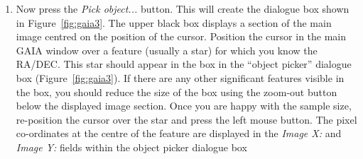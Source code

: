 \documentclass[twoside,11pt]{article}
\newcommand{\latex}[1]{#1}
\newcommand{\html}[1]{}
\renewcommand{\_}{\texttt{\symbol{95}}}
\begin{document}
\begin{enumerate}
\item Now press the \emph{Pick object...} button. This will create the
dialogue box shown in \latex{Figure~\ref{fig:gaia3}.} \html{the next figure.}
The upper black box displays a section of the main image centred on the position 
of the cursor. Position the cursor in the main GAIA window over a feature
(usually a star) for which you know the RA/DEC. This star should appear
in the box in the ``object picker'' dialogue box (Figure~\ref{fig:gaia3}).
If there are any other significant features visible in the box, you should 
reduce the size of the box using the zoom-out button below the displayed
image section. Once you are happy with the
sample size, re-position the cursor over the star and press the left
mouse button. The pixel co-ordinates at the centre of the feature are
displayed in the \emph{Image X:} and \emph{Image Y:} fields within the
object picker dialogue box


\end{enumerate}
\end{document}
